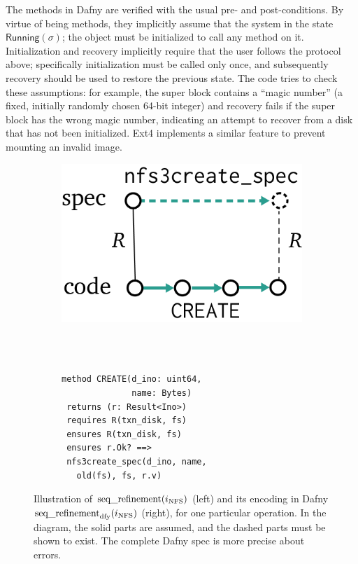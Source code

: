 The methods in Dafny are verified with the usual pre- and post-conditions. By
virtue of being methods, they implicitly assume that the system in the state
$\mathsf{Running}(\sigma)$; the  object must be initialized to call
any method on it. Initialization and recovery implicitly require that the user
follows the protocol above; specifically initialization must be called only
once, and subsequently recovery should be used to restore the previous state.
The code tries to check these assumptions: for example, the super block contains
a ``magic number'' (a fixed, initially randomly chosen 64-bit integer) and
recovery fails if the super block has the wrong magic number, indicating an
attempt to recover from a disk that has not been initialized. Ext4 implements a
similar feature to prevent mounting an invalid image.

\begin{figure}
  \centering
  \begin{subfigure}{0.25\textwidth}
    \includegraphics{fig/sequential-refinement.png}
  \end{subfigure}~~~~~\vrule~~~~%
\begin{subfigure}{0.3\textwidth}
  {\small
\begin{verbatim}

method CREATE(d_ino: uint64,
              name: Bytes)
 returns (r: Result<Ino>)
 requires R(txn_disk, fs)
 ensures R(txn_disk, fs)
 ensures r.Ok? ==>
 nfs3create_spec(d_ino, name,
   old(fs), fs, r.v)
\end{verbatim}
}
\end{subfigure}
\vspace{0.5\baselineskip}
  \caption[Illustration of sequential refinement and its Dafny encoding]%
  {Illustration of $\operatorname{seq\_refinement}(i_{\mathrm{NFS}})$ (left) and its encoding
in Dafny $\operatorname{seq\_refinement}_{\mathrm{dfy}}(i_{\mathrm{NFS}})$ (right), for one particular operation.
In the diagram, the solid parts are assumed, and the
dashed parts must be shown to exist. The complete Dafny spec is more precise about
errors.}
  \label{fig:refinement}
\end{figure}

